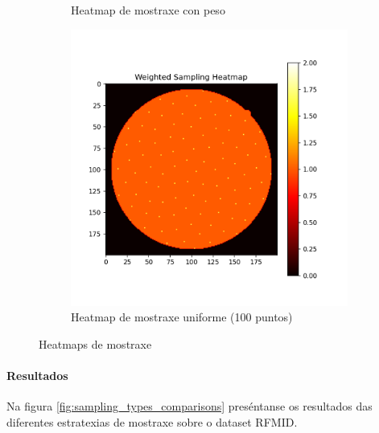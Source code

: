\begin{figure}[ht]
\begin{subfigure}[b]{0.3\textwidth}
        \caption{Heatmap de mostraxe con peso}
        \label{fig:weighted_sampling_heatmap}
    \end{subfigure}
    \hfill
    \begin{subfigure}[b]{0.3\textwidth}
        \centering
        \includegraphics[width=\textwidth]{imaxes/muestraje/uniform_sampling_heatmap.png}
        \caption{Heatmap de mostraxe uniforme (100 puntos)}
        \label{fig:uniform_sampling_heatmap}
    \end{subfigure}
    \caption{Heatmaps de mostraxe}
    \label{fig:sampling_heatmaps}
\end{figure}
\FloatBarrier

\paragraph{Resultados}
\label{par:Resultados-sampling}

Na figura \ref{fig:sampling_types_comparisons} preséntanse os resultados das diferentes estratexias de mostraxe sobre o dataset RFMID.


